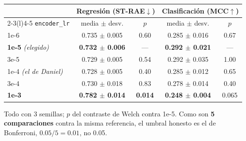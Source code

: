 \documentclass[11pt,a4paper]{article}
\newcommand{\var}[1]{\texttt{#1}}
\begin{document}
\begin{center}
\begin{tabular}{lcccc}
\toprule
& \multicolumn{2}{c}{Regresión (ST-RAE$\downarrow$)} & \multicolumn{2}{c}{Clasificación (MCC$\uparrow$)} \\
\cmidrule(r){2-3}\cmidrule(l){4-5}
\var{encoder\_lr} & media $\pm$ desv. & $p$ & media $\pm$ desv. & $p$ \\ \midrule
1e-6 & 0.735 $\pm$ 0.005 & 0.60 & 0.285 $\pm$ 0.016 & 0.67 \\
\textbf{1e-5} \emph{(elegido)} & \textbf{0.732 $\pm$ 0.006} & --- & \textbf{0.292 $\pm$ 0.021} & --- \\
3e-5 & 0.729 $\pm$ 0.005 & 0.54 & 0.292 $\pm$ 0.035 & 1.00 \\
1e-4 \emph{(el de Daniel)} & 0.728 $\pm$ 0.005 & 0.40 & 0.285 $\pm$ 0.012 & 0.65 \\
3e-4 & 0.730 $\pm$ 0.018 & 0.83 & 0.278 $\pm$ 0.014 & 0.40 \\
\textbf{1e-3} & \textbf{0.782 $\pm$ 0.014} & \textbf{0.014} & \textbf{0.248 $\pm$ 0.004} & 0.065 \\
\bottomrule
\end{tabular}
\end{center}

\noindent Todo con 3 semillas; $p$ del contraste de Welch contra 1e-5. Como son \textbf{5
comparaciones} contra la misma referencia, el umbral honesto es el de Bonferroni,
$0.05/5 = \mathbf{0.01}$, no 0.05.
\end{document}
